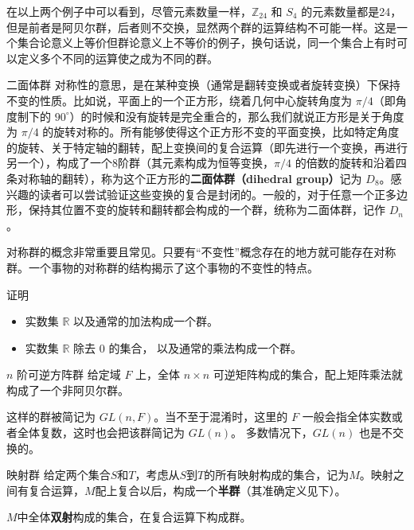 在以上两个例子中可以看到，尽管元素数量一样，$\mathbb{Z}_{24}$ 和 $S_4$ 的元素数量都是24，但是前者是阿贝尔群，后者则不交换，显然两个群的运算结构不可能一样。这是一个集合论意义上等价但群论意义上不等价的例子，换句话说，同一个集合上有时可以定义多个不同的运算使之成为不同的群。

\begin{example}{二面体群}\label{ex_Group_4}
对称性的意思，是在某种变换（通常是翻转变换或者旋转变换）下保持不变的性质。比如说，平面上的一个正方形，绕着几何中心旋转角度为 $\pi/4$（即角度制下的 $90^\circ$）的时候和没有旋转是完全重合的，那么我们就说正方形是关于角度为 $\pi/4$ 的旋转对称的。所有能够使得这个正方形不变的平面变换，比如特定角度的旋转、关于特定轴的翻转，配上变换间的复合运算（即先进行一个变换，再进行另一个），构成了一个8阶群（其元素构成为恒等变换，$\pi/4$ 的倍数的旋转和沿着四条对称轴的翻转），称为这个正方形的\textbf{二面体群（dihedral group）}记为 $D_8$。感兴趣的读者可以尝试验证这些变换的复合是封闭的。一般的，对于任意一个正多边形，保持其位置不变的旋转和翻转都会构成的一个群，统称为二面体群，记作 $D_n$。
\end{example}
对称群的概念非常重要且常见。只要有“不变性”概念存在的地方就可能存在对称群。一个事物的对称群的结构揭示了这个事物的不变性的特点。

\begin{exercise}{}
证明
\begin{itemize}
\item 实数集 $\mathbb R$ 以及通常的加法构成一个群。
\item 实数集 $\mathbb R$ 除去 $0$ 的集合， 以及通常的乘法构成一个群。
\end{itemize}
\end{exercise}

\begin{example}{$n$ 阶可逆方阵群}\label{ex_Group_5}
给定域 $F$ 上，全体 $n\times n$ 可逆矩阵构成的集合，配上矩阵乘法就构成了一个非阿贝尔群。%

这样的群被简记为 $GL(n, F)$。当不至于混淆时，这里的 $F$ 一般会指全体实数或者全体复数，这时也会把该群简记为 $GL(n)$。 多数情况下，$GL(n)$ 也是不交换的。
\end{example}


\begin{example}{映射群}\label{ex_Group_6}
给定两个集合$S$和$T$，考虑从$S$到$T$的所有映射构成的集合，记为$M$。映射之间有复合运算，$M$配上复合以后，构成一个\textbf{半群}（其准确定义见下）。

$M$中全体\textbf{双射}构成的集合，在复合运算下构成群。
\end{example}

